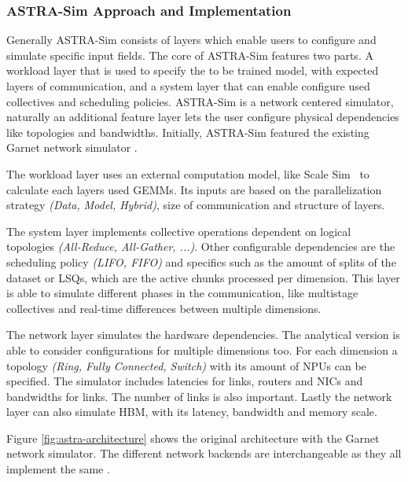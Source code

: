 \subsubsection*{ASTRA-Sim Approach and Implementation}
Generally \ac{ASTRA-Sim} consists of layers which enable users to configure and simulate specific input fields. The core of ASTRA-Sim features two parts. A workload layer that is used to specify the to be trained model, with expected layers of communication, and a system layer that can enable configure used collectives and scheduling policies.
\ac{ASTRA-Sim} is a network centered simulator, naturally an additional feature layer lets the user configure physical dependencies like topologies and bandwidths.
Initially, \ac{ASTRA-Sim} featured the existing Garnet network simulator \cite{agarwal_garnet_2009}. %

The workload layer uses an external computation model, like Scale Sim~\cite{samajdar_scale-sim_2019} to calculate each layers used \acp{GEMM}. Its inputs are based on the parallelization strategy \textit{(Data, Model, Hybrid)}, size of communication and structure of layers. 

The system layer implements collective operations dependent on logical topologies \textit{(All-Reduce, All-Gather, ...)}. Other configurable dependencies are the scheduling policy \textit{(\ac{LIFO}, \ac{FIFO})} and specifics such as the amount of splits of the dataset or \acp{LSQ}, which are the active chunks processed per dimension. This layer is able to simulate different phases in the communication, like multistage collectives and real-time differences between multiple dimensions.

The network layer simulates the hardware dependencies. The analytical version is able to consider configurations for multiple dimensions too. For each dimension a topology \textit{(Ring, Fully Connected, Switch)} with its amount of \acp{NPU} can be specified. The simulator includes latencies for links, routers and \acp{NIC} and bandwidths for links. The number of links is also important. Lastly the network layer can also simulate \ac{HBM}, with its latency, bandwidth and memory scale. 

Figure \ref{fig:astra-architecture} shows the original architecture with the Garnet network simulator. The different network backends are interchangeable as they all implement the same .

